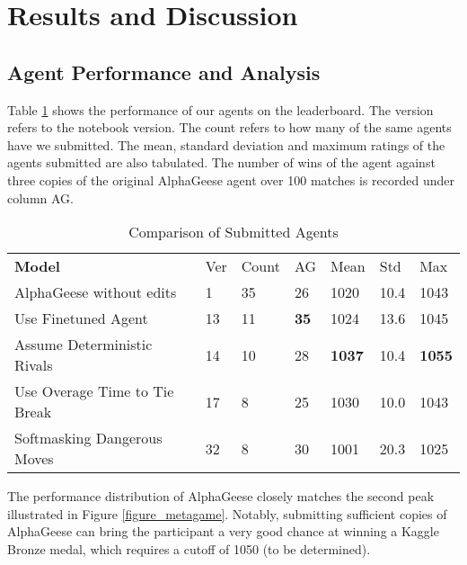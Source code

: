 \section{Results and Discussion}
\label{section_discussion}

\subsection{Agent Performance and Analysis}
\label{subsection_results}

Table \ref{table_scores} shows the performance of our agents on the leaderboard. The version refers to the notebook version. The count refers to how many of the same agents have we submitted. The mean, standard deviation and maximum ratings of the agents submitted are also tabulated. The number of wins of the agent against three copies of the original AlphaGeese agent over 100 matches is recorded under column AG.


\begin{table}[hbt!]
\begin{tabular}{lllllll}
\textbf{Model}                & Ver & Count & AG & Mean          & Std  & Max           \\
AlphaGeese without edits      & 1   & 35    & 26 & 1020          & 10.4 & 1043          \\
Use Finetuned Agent           & 13  & 11    & \textbf{35} & 1024 & 13.6 & 1045          \\
Assume Deterministic Rivals   & 14  & 10    & 28 & \textbf{1037} & 10.4 & \textbf{1055} \\
Use Overage Time to Tie Break & 17  & 8     & 25 & 1030          & 10.0 & 1043          \\
Softmasking Dangerous Moves   & 32  & 8     & 30 & 1001          & 20.3 & 1025         
\end{tabular}
\caption{Comparison of Submitted Agents}
\label{table_scores}
\end{table}

The performance distribution of AlphaGeese closely matches the second peak illustrated in Figure \ref{figure_metagame}. Notably, submitting sufficient copies of AlphaGeese \cite{notebook_alphageese_baseline} can bring the participant a very good chance at winning a  Kaggle Bronze medal, which requires a cutoff of 1050 (to be determined).

